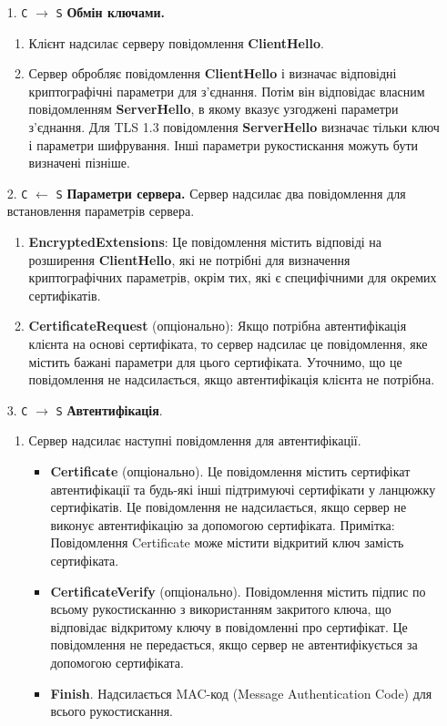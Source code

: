 \begin{enumerate}
    \item[1. \texttt{С} $\longrightarrow$ \texttt{S}] \textbf{Обмін ключами.} 
    \begin{enumerate}
        \item Клієнт надсилає серверу повідомлення \textbf{ClientHello}.
        \item Сервер обробляє повідомлення \textbf{ClientHello} і визначає відповідні криптографічні параметри для з'єднання. Потім він відповідає власним повідомленням \textbf{ServerHello}, в якому вказує узгоджені параметри з'єднання. Для TLS 1.3 повідомлення \textbf{ServerHello} визначає тільки ключ і параметри шифрування. Інші параметри рукостискання можуть бути визначені пізніше.
    \end{enumerate}
        
    \item[2. \texttt{С} $\longleftarrow$ \texttt{S}] \textbf{Параметри сервера.} Сервер надсилає два повідомлення для встановлення параметрів сервера.

    \begin{enumerate}
        \item \textbf{EncryptedExtensions}: Це повідомлення містить відповіді на розширення \textbf{ClientHello}, які не потрібні для визначення криптографічних параметрів, окрім тих, які є специфічними для окремих сертифікатів.
        \item \textbf{CertificateRequest} (опціонально): Якщо потрібна автентифікація клієнта на основі сертифіката, то сервер надсилає це повідомлення, яке містить бажані параметри для цього сертифіката. Уточнимо, що це повідомлення не надсилається, якщо автентифікація клієнта не потрібна.
    \end{enumerate}
    
    \item[3. \texttt{С} $\longrightarrow$ \texttt{S}] \textbf{Автентифікація}. 
    \begin{enumerate}
        \item 
              Сервер надсилає наступні повідомлення для автентифікації.
              \begin{itemize}
                \item \textbf{Certificate} (опціонально). Це повідомлення містить сертифікат автентифікації та будь-які інші підтримуючі сертифікати у ланцюжку сертифікатів. Це повідомлення не надсилається, якщо сервер не виконує автентифікацію за допомогою сертифіката. Примітка: Повідомлення Certificate може містити відкритий ключ замість сертифіката.
                \item \textbf{CertificateVerify} (опціонально). Повідомлення містить підпис по всьому рукостисканню з використанням закритого ключа, що відповідає відкритому ключу в повідомленні про сертифікат. Це повідомлення не передається, якщо сервер не автентифікується за допомогою сертифіката.
                \item \textbf{Finish}. Надсилається MAC-код (Message Authentication Code) для всього рукостискання.
              \end{itemize}
              

\end{enumerate}
\end{enumerate}
